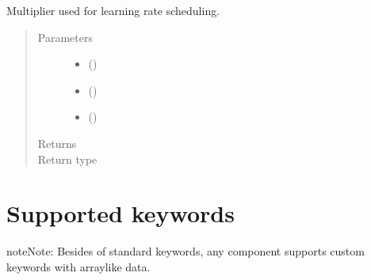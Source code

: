 \documentclass[letterpaper,10pt,english]{sphinxmanual}
\begin{document}
\begin{fulllineitems}
\label{\detokenize{api/training:geology.metamodelling.utils.lr_lambda}}
Multiplier used for learning rate scheduling.
\begin{quote}\begin{description}
\item[{Parameters}] \leavevmode\begin{itemize}
\item {} 
 () \textendash{} 

\item {} 
 () \textendash{} 

\item {} 
 () \textendash{} 

\end{itemize}

\item[{Returns}] \leavevmode
{}

\item[{Return type}] \leavevmode
{}

\end{description}\end{quote}

\end{fulllineitems}



\chapter{Supported keywords}
\label{\detokenize{index:supported-keywords}}
\begin{sphinxadmonition}{note}{Note:}
Besides of standard keywords, any component supports
custom keywords with array\sphinxhyphen{}like data.
\end{sphinxadmonition}
\end{document}
